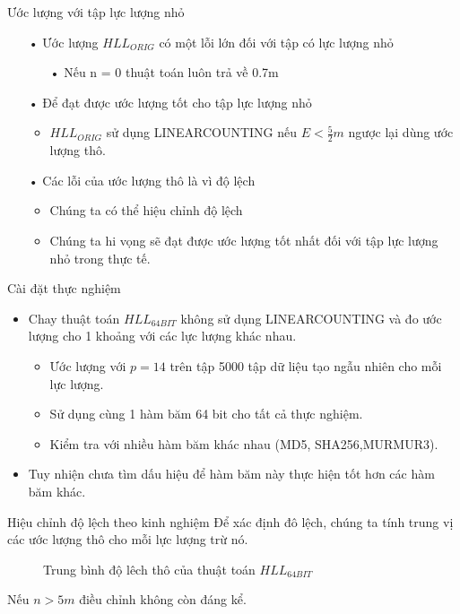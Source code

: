 \documentclass{beamer}
\newcommand{\bi}{\begin{itemize}}
\newcommand{\ei}{\end{itemize}}
\begin{document}
\begin{frame}{Ước lượng với tập lực lượng nhỏ}
\begin{itemize}
\item[•] Ước lượng $HLL_{ORIG}$ có một lỗi lớn đối với tập có lực lượng nhỏ
\begin{itemize}
\item[•] Nếu n = 0 thuật toán luôn trả về 0.7m 
\end{itemize}
\item[•] Để đạt được ước lượng tốt cho tập lực lượng nhỏ
\begin{itemize}
\item $HLL_{ORIG}$ sử dụng LINEARCOUNTING nếu $E < \frac{5}{2}m$ ngược lại dùng ước lượng thô. 
\end{itemize}
\item[•] Các lỗi của ước lượng thô là vì độ lệch
\begin{itemize}
\item Chúng ta có thể hiệu chỉnh độ lệch
\item Chúng ta hi vọng sẽ đạt được ước lượng tốt nhất đối với tập lực lượng nhỏ trong thực tế.
\end{itemize}
\end{itemize}
\end{frame}
\begin{frame}{Cài đặt thực nghiệm}
\bi
\item Chay thuật toán $HLL_{64BIT}$ không sử dụng LINEARCOUNTING và đo ước lượng cho 1 khoảng với các lực lượng khác nhau.
\bi
\item Ước lượng với $p = 14$ trên tập 5000 tập dữ liệu tạo ngẫu nhiên cho mỗi lực lượng.
\item Sử dụng cùng 1 hàm băm 64 bit cho tất cả thực nghiệm.
\item Kiểm tra với nhiều hàm băm khác nhau (MD5, SHA256,MURMUR3).
\ei
\item Tuy nhiện chưa tìm dấu hiệu để hàm băm này thực hiện tốt hơn các hàm băm khác.
\ei
\end{frame}
\begin{frame}{Hiệu chỉnh độ lệch theo kinh nghiệm}
Để xác định đô lệch, chúng ta tính trung vị các ước lượng thô cho mỗi lực lượng trừ nó.
\begin{figure}[h]
\caption{Trung bình độ lêch thô của thuật toán $HLL_{64BIT}$}
\end{figure}
Nếu  $n > 5m$ điều chỉnh không còn đáng kể.
\end{frame}
\end{document}
